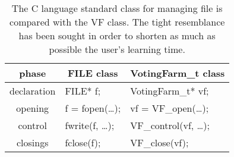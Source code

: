 \documentclass[11pt]{article}
\begin{document}
\begin{table}[h]
\begin{center}
\begin{tabular}{|c|l|l|}\hline
{\bf phase}&\multicolumn{1}{|c|}{\bf{\sf FILE} class}&\multicolumn{1}{|c|}{\bf{\sf VotingFarm\_t} class}\\ \hline
declaration & {\sf FILE* f;} & {\sf VotingFarm\_t* vf;}\\ \hline
opening & {\sf f = fopen(\ldots);} & {\sf vf = VF\_open(\ldots);}\\ \hline
control & {\sf fwrite(f, \ldots);} & {\sf VF\_control(vf, \ldots);}\\ \hline
closings & {\sf fclose(f);} & {\sf VF\_close(vf);}\\ \hline
\end{tabular}
\end{center}
\caption{The C language standard class for managing file is compared with
the VF class. The tight resemblance has been sought in order to shorten
as much as possible the user's learning time.}
\label{cmp}
\end{table}

\vfill\eject
\end{document}
